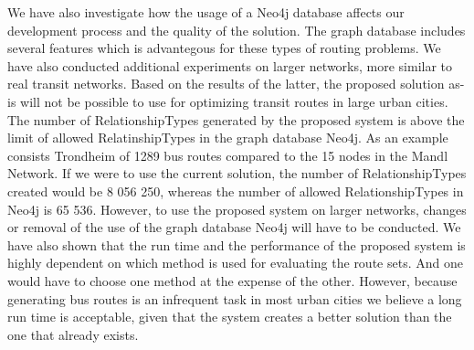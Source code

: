 We have also investigate how the usage of a Neo4j database affects our development process and the quality of the solution. The graph database includes several features which is advantegous for these types of routing problems. We have also conducted additional experiments on larger networks, more similar to real transit networks. Based on the results of the latter, the proposed solution as-is will not be possible to use for optimizing transit routes in large urban cities. The number of RelationshipTypes generated by the proposed system is above the limit of allowed RelatinshipTypes in the graph database Neo4j. As an example consists Trondheim of 1289 bus routes compared to the 15 nodes in the Mandl Network. If we were to use the current solution, the number of RelationshipTypes created would be 8 056 250, whereas the number of allowed RelationshipTypes in Neo4j is 65 536. However, to use the proposed system on larger networks, changes or removal of the use of the graph database Neo4j will have to be conducted. We have also shown that the run time and the performance of the proposed system is highly dependent on which method is used for evaluating the route sets. And one would have to choose one method at the expense of the other. However, because generating bus routes is an infrequent task in most urban cities we believe a long run time is acceptable, given that the system creates a better solution than the one that already exists. 